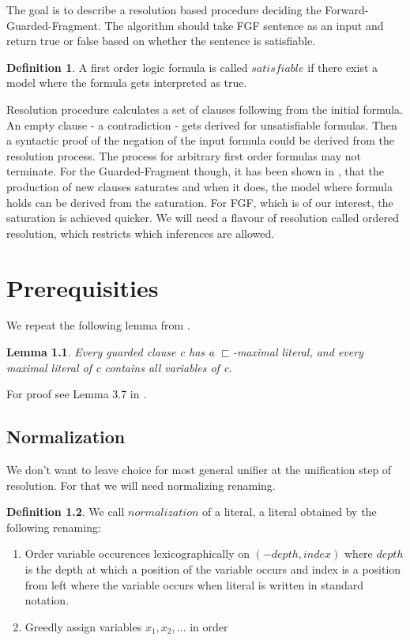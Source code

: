 \documentclass[english, shortabstract]{iithesis}
\theoremstyle{definition} \newtheorem{definition}{Definition}[chapter]
\theoremstyle{remark} \newtheorem{remark}[definition]{Observation}
\theoremstyle{plain} \newtheorem{theorem}[definition]{Theorem}
\theoremstyle{plain} \newtheorem{lemma}[definition]{Lemma}
\begin{document}
The goal is to describe a resolution based procedure deciding the Forward-Guarded-Fragment.
The algorithm should take FGF sentence as an input and return true or false based on whether the sentence is satisfiable.

\begin{definition}
A first order logic formula is called $satisfiable$ if there exist a model where the formula gets interpreted as true.
\end{definition}

Resolution procedure calculates a set of clauses following from the initial formula.
An empty clause - a contradiction - gets derived for unsatisfiable formulas. 
Then a syntactic proof of the negation of the input formula could be derived from the resolution process.
The process for arbitrary first order formulas may not terminate.
For the Guarded-Fragment though, it has been shown in \cite{resolution GF}, that the production of new clauses saturates
and when it does, the model where formula holds can be derived from the saturation.
For FGF, which is of our interest, the saturation is achieved quicker.
We will need a flavour of resolution called ordered resolution, which restricts which inferences are allowed.

\chapter{Prerequisities}
We repeat the following lemma from \cite{resolution GF}.
\begin{lemma}
Every guarded clause c has a $\sqsubset$-maximal literal, and every maximal literal
of c contains all variables of c.
\end{lemma}
For proof see Lemma 3.7 in \cite{resolution GF}.

\section{Normalization}
We don't want to leave choice for most general unifier at the unification step of resolution.
For that we will need normalizing renaming.

\begin{definition}
We call $normalization$ of a literal, a literal obtained by the following renaming:
\begin{enumerate}
    \item Order variable occurences lexicographically on $(-depth, index)$ 
    where $depth$ is the depth at which a position of the variable occurs and index is a position from left where the variable occurs when literal is written in standard notation.
    \item Greedly assign variables $x_1, x_2, \dots$ in order
\end{enumerate}
\end{definition}
\end{document}
